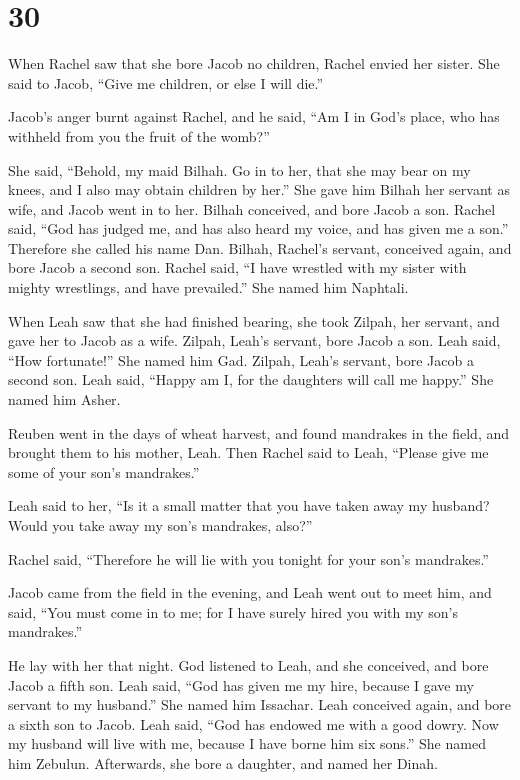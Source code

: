 \hypertarget{section-29}{%
\section{30}\label{section-29}}

 When Rachel saw that she bore Jacob no children, Rachel
envied her sister. She said to Jacob, ``Give me children, or else I will
die.''

 Jacob's anger burnt against Rachel, and he said, ``Am I
in God's place, who has withheld from you the fruit of the womb?''

 She said, ``Behold, my maid Bilhah. Go in to her, that
she may bear on my knees, and I also may obtain children by her.''
 She gave him Bilhah her servant as wife, and Jacob went
in to her.  Bilhah conceived, and bore Jacob a son.
 Rachel said, ``God has judged me, and has also heard my
voice, and has given me a son.'' Therefore she called his name Dan.
 Bilhah, Rachel's servant, conceived again, and bore Jacob
a second son.  Rachel said, ``I have wrestled with my
sister with mighty wrestlings, and have prevailed.'' She named him
Naphtali.

 When Leah saw that she had finished bearing, she took
Zilpah, her servant, and gave her to Jacob as a wife. 
Zilpah, Leah's servant, bore Jacob a son.  Leah said,
``How fortunate!'' She named him Gad.  Zilpah, Leah's
servant, bore Jacob a second son.  Leah said, ``Happy am
I, for the daughters will call me happy.'' She named him Asher.

 Reuben went in the days of wheat harvest, and found
mandrakes in the field, and brought them to his mother, Leah. Then
Rachel said to Leah, ``Please give me some of your son's mandrakes.''

 Leah said to her, ``Is it a small matter that you have
taken away my husband? Would you take away my son's mandrakes, also?''

Rachel said, ``Therefore he will lie with you tonight for your son's
mandrakes.''

 Jacob came from the field in the evening, and Leah went
out to meet him, and said, ``You must come in to me; for I have surely
hired you with my son's mandrakes.''

He lay with her that night.  God listened to Leah, and
she conceived, and bore Jacob a fifth son.  Leah said,
``God has given me my hire, because I gave my servant to my husband.''
She named him Issachar.  Leah conceived again, and bore a
sixth son to Jacob.  Leah said, ``God has endowed me with
a good dowry. Now my husband will live with me, because I have borne him
six sons.'' She named him Zebulun.  Afterwards, she bore
a daughter, and named her Dinah.

